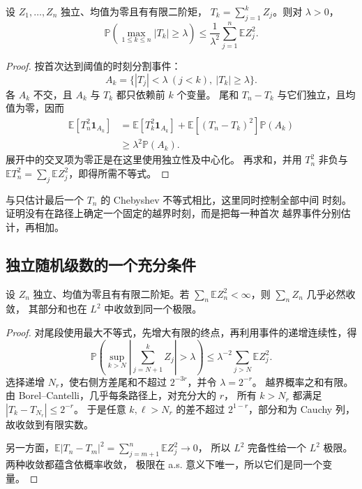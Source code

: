 \begin{theorem}
\label{thm:kolmogorov-maximal-inequality}
设 $Z_1,\ldots,Z_n$ 独立、均值为零且有有限二阶矩，
$T_k=\sum_{j=1}^kZ_j$。则对 $\lambda>0$，
\[
 \mathbb P\left(\max_{1\le k\le n}|T_k|\ge\lambda\right)
 \le\frac1{\lambda^2}\sum_{j=1}^n\mathbb E Z_j^2.
\]
\end{theorem}

\begin{proof}
按首次达到阈值的时刻分割事件：
\[
 A_k=\{|T_j|<\lambda\ (j<k),\ |T_k|\ge\lambda\}.
\]
各 $A_k$ 不交，且 $A_k$ 与 $T_k$ 都只依赖前 $k$ 个变量。
尾和 $T_n-T_k$ 与它们独立，且均值为零，因而
\begin{align*}
 \mathbb E[T_n^2\mathbf1_{A_k}]
 &=\mathbb E[T_k^2\mathbf1_{A_k}]
   +\mathbb E[(T_n-T_k)^2]\mathbb P(A_k)\\
 &\ge\lambda^2\mathbb P(A_k).
\end{align*}
展开中的交叉项为零正是在这里使用独立性及中心化。
再求和，并用 $T_n^2$ 非负与
$\mathbb E T_n^2=\sum_j\mathbb E Z_j^2$，即得所需不等式。
\end{proof}

与只估计最后一个 $T_n$ 的 Chebyshev 不等式相比，这里同时控制全部中间
时刻。证明没有在路径上确定一个固定的越界时刻，而是把每一种首次
越界事件分别估计，再相加。

\subsection{独立随机级数的一个充分条件}

\begin{theorem}[方差可求和的独立级数]
\label{thm:independent-series-variance}
设 $Z_n$ 独立、均值为零且有有限二阶矩。若
$\sum_n\mathbb E Z_n^2<\infty$，则 $\sum_nZ_n$ 几乎必然收敛，
其部分和也在 $L^2$ 中收敛到同一个极限。
\end{theorem}

\begin{proof}
对尾段使用最大不等式，先增大有限的终点，再利用事件的递增连续性，得
\[
 \mathbb P\left(\sup_{k>N}\left|\sum_{j=N+1}^kZ_j\right|>\lambda\right)
 \le\lambda^{-2}\sum_{j>N}\mathbb E Z_j^2.
\]
选择递增 $N_r$，使右侧方差尾和不超过 $2^{-3r}$，并令 $\lambda=2^{-r}$。
越界概率之和有限。由 Borel--Cantelli，几乎每条路径上，对充分大的 $r$，
所有 $k>N_r$ 都满足 $|T_k-T_{N_r}|\le2^{-r}$。
于是任意 $k,\ell>N_r$ 的差不超过 $2^{1-r}$，部分和为 Cauchy 列，
故收敛到有限实数。

另一方面，$\mathbb E|T_n-T_m|^2=\sum_{j=m+1}^n\mathbb E Z_j^2\to0$，
所以 $L^2$ 完备性给一个 $L^2$ 极限。两种收敛都蕴含依概率收敛，
极限在 a.s. 意义下唯一，所以它们是同一个变量。
\end{proof}


